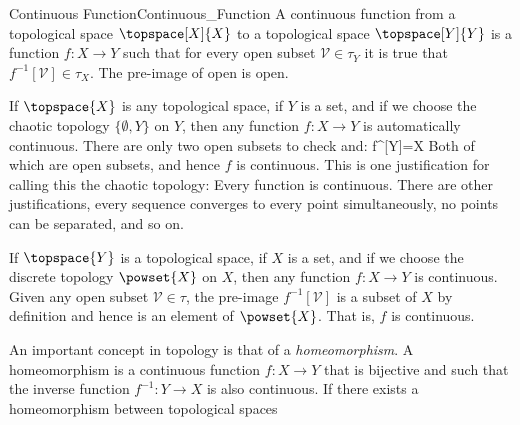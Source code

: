 \documentclass{book}                                                           %
\begin{document}
                \begin{fdefinition}{Continuous Function}{Continuous_Function}
                    A continuous function from a topological space
                    $\topspace[X]{X}$ to a topological space $\topspace[Y]{Y}$
                    is a function $f:X\rightarrow{Y}$ such that for every open
                    subset $\mathcal{V}\in\tau_{Y}$ it is true that
                    $f^{\minus{1}}[\mathcal{V}]\in\tau_{X}$. The pre-image of
                    open is open.
                \end{fdefinition}
                \begin{example}
                    If $\topspace{X}$ is any topological space, if
                    $Y$ is a set, and if we choose the chaotic topology
                    $\{\emptyset,Y\}$ on $Y$, then any function
                    $f:X\rightarrow{Y}$ is automatically continuous. There are
                    only two open subsets to check and:
                                {f^{}[Y]=X}
                    Both of which are open subsets, and hence $f$ is continuous.
                    This is one justification for calling this the chaotic
                    topology: Every function is continuous. There are other
                    justifications, every sequence converges to every point
                    simultaneously, no points can be separated, and so on.
                \end{example}
                \begin{example}
                    If $\topspace{Y}$ is a topological space, if $X$ is a set,
                    and if we choose the discrete topology $\powset{X}$ on $X$,
                    then any function $f:X\rightarrow{Y}$ is continuous. Given
                    any open subset $\mathcal{V}\in\tau$, the pre-image
                    $f^{\minus{1}}[\mathcal{V}]$ is a subset of $X$ by
                    definition and hence is an element of $\powset{X}$. That is,
                    $f$ is continuous.
                \end{example}
                An important concept in topology is that of a
                \textit{homeomorphism}. A homeomorphism is a continuous function
                $f:X\rightarrow{Y}$ that is bijective and such that the inverse
                function $f^{\minus{1}}:Y\rightarrow{X}$ is also continuous.
                If there exists a homeomorphism between topological spaces
\end{document}
